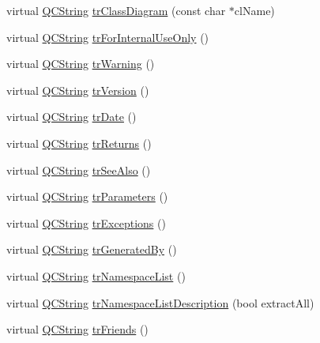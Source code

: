 \begin{DoxyCompactItemize}
\item 
virtual \mbox{\hyperlink{class_q_c_string}{Q\+C\+String}} \mbox{\hyperlink{class_translator_vietnamese_a3dec6e36f38f4f72d25f36ba0ca28c64}{tr\+Class\+Diagram}} (const char $\ast$cl\+Name)
\item 
virtual \mbox{\hyperlink{class_q_c_string}{Q\+C\+String}} \mbox{\hyperlink{class_translator_vietnamese_aeb62b14bc5222d566b1f3b750e53af11}{tr\+For\+Internal\+Use\+Only}} ()
\item 
virtual \mbox{\hyperlink{class_q_c_string}{Q\+C\+String}} \mbox{\hyperlink{class_translator_vietnamese_ade2f9cb0d07b7dbe26ebb76a8562562b}{tr\+Warning}} ()
\item 
virtual \mbox{\hyperlink{class_q_c_string}{Q\+C\+String}} \mbox{\hyperlink{class_translator_vietnamese_a95b6001c8ec477cf2e10182cf773bbfa}{tr\+Version}} ()
\item 
virtual \mbox{\hyperlink{class_q_c_string}{Q\+C\+String}} \mbox{\hyperlink{class_translator_vietnamese_a717e57abc613c4ded493be4c640b304e}{tr\+Date}} ()
\item 
virtual \mbox{\hyperlink{class_q_c_string}{Q\+C\+String}} \mbox{\hyperlink{class_translator_vietnamese_a09c5d21b1c03da3370d8cd5024a6bd6b}{tr\+Returns}} ()
\item 
virtual \mbox{\hyperlink{class_q_c_string}{Q\+C\+String}} \mbox{\hyperlink{class_translator_vietnamese_a9d11e0e4b381412d213609cd321a9275}{tr\+See\+Also}} ()
\item 
virtual \mbox{\hyperlink{class_q_c_string}{Q\+C\+String}} \mbox{\hyperlink{class_translator_vietnamese_a0ee81204e48dab999eb017847cdddfdb}{tr\+Parameters}} ()
\item 
virtual \mbox{\hyperlink{class_q_c_string}{Q\+C\+String}} \mbox{\hyperlink{class_translator_vietnamese_ab4b59788541117f953b1ac9cdb84cdae}{tr\+Exceptions}} ()
\item 
virtual \mbox{\hyperlink{class_q_c_string}{Q\+C\+String}} \mbox{\hyperlink{class_translator_vietnamese_a3807e0385865b46dd324e3107b01bdec}{tr\+Generated\+By}} ()
\item 
virtual \mbox{\hyperlink{class_q_c_string}{Q\+C\+String}} \mbox{\hyperlink{class_translator_vietnamese_ae584dc2ff7c68dbb3a74a51b880e204e}{tr\+Namespace\+List}} ()
\item 
virtual \mbox{\hyperlink{class_q_c_string}{Q\+C\+String}} \mbox{\hyperlink{class_translator_vietnamese_a24d9a17613f924d7eeaa2e69be447e85}{tr\+Namespace\+List\+Description}} (bool extract\+All)
\item 
virtual \mbox{\hyperlink{class_q_c_string}{Q\+C\+String}} \mbox{\hyperlink{class_translator_vietnamese_a243a24481a6730ce4d65d2e78bd7d485}{tr\+Friends}} ()

\end{DoxyCompactItemize}
